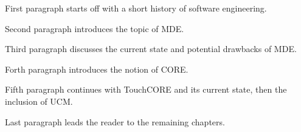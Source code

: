 First paragraph starts off with a short history of software engineering.

Second paragraph introduces the topic of MDE.

Third paragraph discusses the current state and potential drawbacks of MDE.

Forth paragraph introduces the notion of CORE.

Fifth paragraph continues with TouchCORE and its current state, then the inclusion of UCM.

Last paragraph leads the reader to the remaining chapters.
